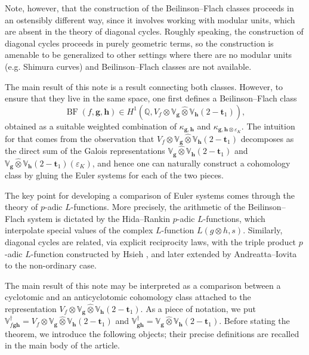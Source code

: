 \documentclass[a4paper,11pt]{amsart}
\theoremstyle{plain}
\theoremstyle{definition}
\theoremstyle{remark}
\newcommand{\bb}{\mathbb}
\DeclareMathOperator{\BF}{BF}
\newcommand{\hg}{{\mathbf{g}}}
\newcommand{\hh}{{\mathbf h}}
\numberwithin{equation}{section}
\begin{document}
Note, however, that the construction of the Beilinson--Flach classes proceeds in an ostensibly different way, since it involves working with modular units, which are absent in the theory of diagonal cycles. Roughly speaking, the construction of diagonal cycles proceeds in purely geometric terms, so the construction is amenable to be generalized to other settings where there are no modular units (e.g. Shimura curves) and Beilinson--Flach classes are not available.

The main result of this note is a result connecting both classes. However, to ensure that they live in the same space, one first defines a Beilinson--Flach class \[ \BF(f,\hg,\hh) \in H^1(\mathbb Q, V_f \otimes \mathbb V_{\hg} \hat{\otimes} \mathbb V_{\hh}(2-{\mathbf t}_1)), \] obtained as a suitable weighted combination of $\kappa_{\hg,\hh}$ and $\kappa_{\hg,\hh \otimes \varepsilon_K}$. The intuition for that comes from the observation that $V_f \otimes \mathbb V_{\hg} \hat \otimes \mathbb V_{\hh}(2-{\mathbf t}_1)$ decomposes as the direct sum of the Galois representations $\mathbb V_{\hg} \hat \otimes \mathbb V_{\hh}(2-{\mathbf t}_1)$ and $\mathbb V_{\hg} \hat \otimes \mathbb V_{\hh}(2-{\mathbf t}_1)(\varepsilon_K)$, and hence one can naturally construct a cohomology class by gluing the Euler systems for each of the two pieces.

The key point for developing a comparison of Euler systems comes through the theory of $p$-adic $L$-functions. More precisely, the arithmetic of the Beilinson--Flach system is dictated by the Hida--Rankin $p$-adic $L$-functions, which interpolate special values of the complex $L$-function $L(g \otimes h,s)$. Similarly, diagonal cycles are related, via explicit reciprocity laws, with the triple product $p$-adic $L$-function constructed by Hsieh \cite{Hs}, and later extended by Andreatta--Iovita \cite{AI} to the non-ordinary case.

The main result of this note may be interpreted as a comparison between a cyclotomic and an anticyclotomic cohomology class attached to the representation $V_f \otimes \mathbb V_{\hg} \hat \otimes \mathbb V_{\hh}(2-{\mathbf t}_1)$. As a piece of notation, we put $\bb{V}_{f\hg\hh}^\dagger=V_f\otimes\bb{V}_{\hg}\hat{\otimes} \bb{V}_\hh (2-\mathbf{t}_1)$ and $\bb{V}_{\hg\hh}^\dagger=\bb{V}_{\hg}\hat{\otimes}\bb{V}_\hh(2-\mathbf{t}_1)$. Before stating the theorem, we introduce the following objects; their precise definitions are recalled in the main body of the article.
\end{document}
